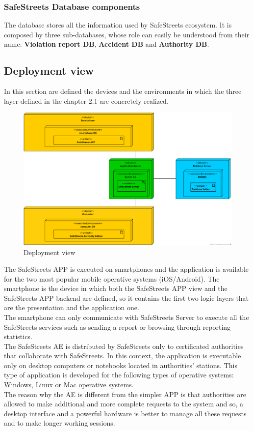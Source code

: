 \documentclass{article}
\begin{document}
		\subsubsection{SafeStreets Database components}
		The database stores all the information used by SafeStreets ecosystem. It is composed by three sub-databases, whose role can easily be understood from their name: \textbf{Violation report DB}, \textbf{Accident DB} and \textbf{Authority DB}.
		
		\subsection{Deployment view}
		In this section are defined the devices and the environments in which the three layer defined in the chapter 2.1 are concretely realized.
			\begin{figure}[H]
			\includegraphics [scale=0.5] {diagrams/deployment_view.png}
			\caption[Deployment View]{Deployment view}
			\label{fig:deployment_view}
			\end{figure}
   		The SafeStreets APP is executed on smartphones and the application is available for the two most popular mobile operative systems (iOS/Android).
   		The smartphone is the device in which both the SafeStreets APP view and the SafeStreets APP backend are defined, so it contains the first two logic layers that are the presentation and the application one.\\ The smartphone can only communicate with SafeStreets Server to execute all the SafeStreets services such as sending a report or browsing through reporting statistics.\\
   		The SafeStreets AE is distributed by SafeStreets only to certificated authorities that collaborate with SafeStreets. In this context, the application is executable only on desktop computers or notebooks located in authorities' stations. This type of application is developed for the following types of operative systems: Windows, Linux or Mac operative systems.\\ The reason why the AE is different from the simpler APP is that authorities are allowed to make additional and more complete requests to the system and so, a desktop interface and a powerful hardware is better to manage all these requests and to make longer working sessions.\\\\
\end{document}
